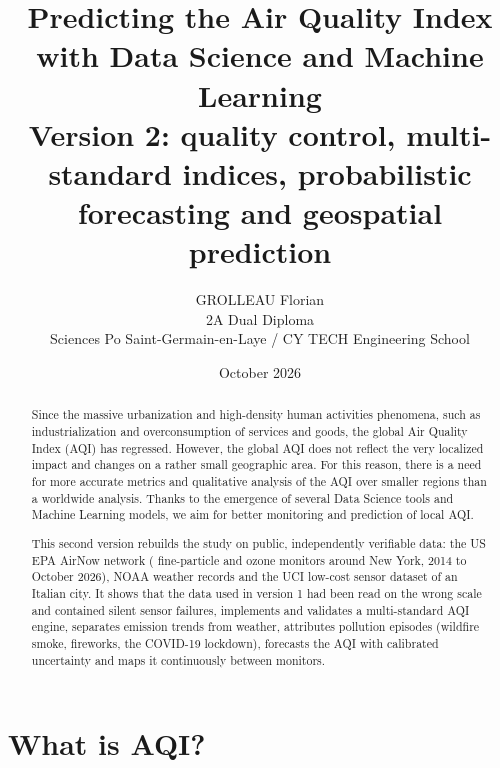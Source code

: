 \documentclass[11pt]{article}
\title{Predicting the Air Quality Index with Data Science and Machine Learning\\[0.3em]\large Version 2: quality control, multi-standard indices, probabilistic forecasting and geospatial prediction}
\author{GROLLEAU Florian\\
2A Dual Diploma \\ Sciences Po Saint-Germain-en-Laye / CY TECH Engineering School}
\date{October 2026}
\begin{document}
\maketitle
\begin{abstract}
Since the massive urbanization and high-density human activities phenomena, such as industrialization and overconsumption of services and goods, the global Air Quality Index (AQI) has regressed. However, the global AQI does not reflect the very localized impact and changes on a rather small geographic area. For this reason, there is a need for more accurate metrics and qualitative analysis of the AQI over smaller regions than a worldwide analysis. Thanks to the emergence of several Data Science tools and Machine Learning models, we aim for better monitoring and prediction of local AQI.

This second version rebuilds the study on public, independently verifiable data: the US EPA AirNow network (\NnetPM{} fine-particle and \NnetOz{} ozone monitors around New York, 2014 to October 2026), NOAA weather records and the UCI low-cost sensor dataset of an Italian city. It shows that the data used in version 1 had been read on the wrong scale and contained silent sensor failures, implements and validates a multi-standard AQI engine, separates emission trends from weather, attributes pollution episodes (wildfire smoke, fireworks, the COVID-19 lockdown), forecasts the AQI with calibrated uncertainty and maps it continuously between monitors.
\end{abstract}

\newpage
\tableofcontents
\newpage

\section{What is AQI?}
\end{document}
